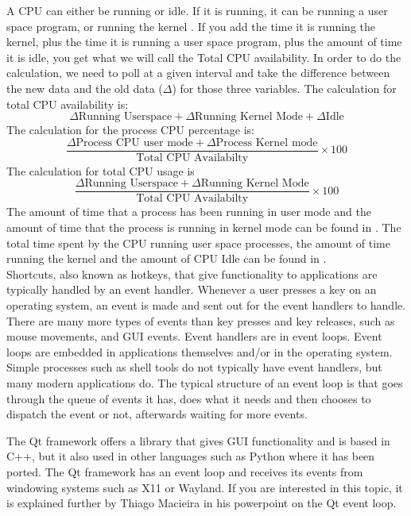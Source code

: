 \documentclass[12pt]{article}
\begin{document}
A CPU can either be running or idle.
If it is running, it can be running a user space program, or running the kernel \cite{scoutBlog}.
If you add the time it is running the kernel, plus the time it is running a user space program, plus the amount of time it is idle, you get what we will call the Total CPU availability.
In order to do the calculation, we need to poll at a given interval and take the difference between the new data and the old data ($\Delta$) for those three variables. The calculation for total CPU availability is:\\
$$ \Delta\text{Running Userspace} + \Delta\text{Running Kernel Mode} + \Delta\text{Idle}$$
The calculation for the process CPU percentage is:\\
$$ \frac{\Delta\text{Process CPU user mode} + \Delta\text{Process Kernel mode}}{\text{Total CPU Availabilty}} \times 100 $$
The calculation for total CPU usage is\\
$$ \frac{\Delta\text{Running Userspace} + \Delta\text{Running Kernel Mode}}{\text{Total CPU Availabilty}} \times 100 $$
The amount of time that a process has been running in user mode and the amount of time that the process is running in kernel mode can be found in . \cite{manProc}
The total time spent by the CPU running user space processes, the amount of time running the kernel and the amount of CPU Idle can be found in  \cite{manProc}.\\
	
	
Shortcuts, also known as hotkeys, that give functionality to applications are typically handled by an event handler.
Whenever a user presses a key on an operating system, an event is made and sent out for the event handlers to handle.
There are many more types of events than key presses and key releases, such as mouse movements, and GUI events.
Event handlers are in event loops. Event loops are embedded in applications themselves and/or in the operating system. Simple processes such as shell tools do not typically have event handlers, but many modern applications do. The typical structure of an event loop is that goes through the queue of events it has, does what it needs and then chooses to dispatch the event or not, afterwards waiting for more events. 

The Qt framework offers a library that gives GUI functionality and is based in C++, but it also used in other languages such as Python where it has been ported.
The Qt framework has an event loop and receives its events from windowing systems such as X11 or Wayland.
If you are interested in this topic, it is explained further by Thiago Macieira in his powerpoint on the Qt event loop\cite{QtSlides}.
\end{document}
